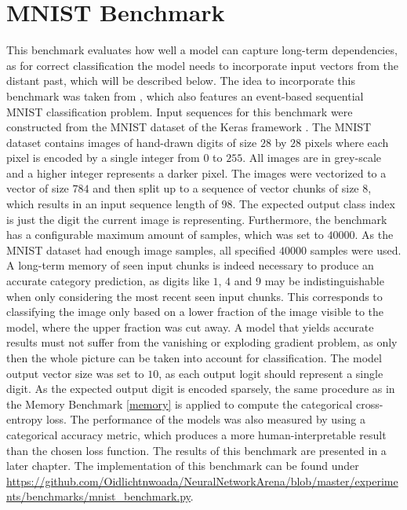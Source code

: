 \documentclass[draft,final]{vutinfth} %
\begin{document}
    \section{MNIST Benchmark} \label{mnist}
    This benchmark evaluates how well a model can capture long-term dependencies, as for correct classification the model needs to incorporate input vectors from the distant past, which will be described below.
    The idea to incorporate this benchmark was taken from \cite{ODELSTM}, which also features an event-based sequential MNIST classification problem.
    Input sequences for this benchmark were constructed from the MNIST dataset of the Keras framework \cite{Keras}.
    The MNIST dataset contains images of hand-drawn digits of size $28$ by $28$ pixels where each pixel is encoded by a single integer from $0$ to $255$.
    All images are in grey-scale and a higher integer represents a darker pixel.
    The images were vectorized to a vector of size $784$ and then split up to a sequence of vector chunks of size $8$, which results in an input sequence length of $98$.
    The expected output class index is just the digit the current image is representing.
    Furthermore, the benchmark has a configurable maximum amount of samples, which was set to $40000$.
    As the MNIST dataset had enough image samples, all specified $40000$ samples were used.
    A long-term memory of seen input chunks is indeed necessary to produce an accurate category prediction, as digits like $1$, $4$ and $9$ may be indistinguishable when only considering the most recent seen input chunks.
    This corresponds to classifying the image only based on a lower fraction of the image visible to the model, where the upper fraction was cut away.
    A model that yields accurate results must not suffer from the vanishing or exploding gradient problem, as only then the whole picture can be taken into account for classification. 
    The model output vector size was set to $10$, as each output logit should represent a single digit.
    As the expected output digit is encoded sparsely, the same procedure as in the Memory Benchmark \ref{memory} is applied to compute the categorical cross-entropy loss.
    The performance of the models was also measured by using a categorical accuracy metric, which produces a more human-interpretable result than the chosen loss function.
    The results of this benchmark are presented in a later chapter.
    The implementation of this benchmark can be found under \url{https://github.com/Oidlichtnwoada/NeuralNetworkArena/blob/master/experiments/benchmarks/mnist_benchmark.py}.
\end{document}
